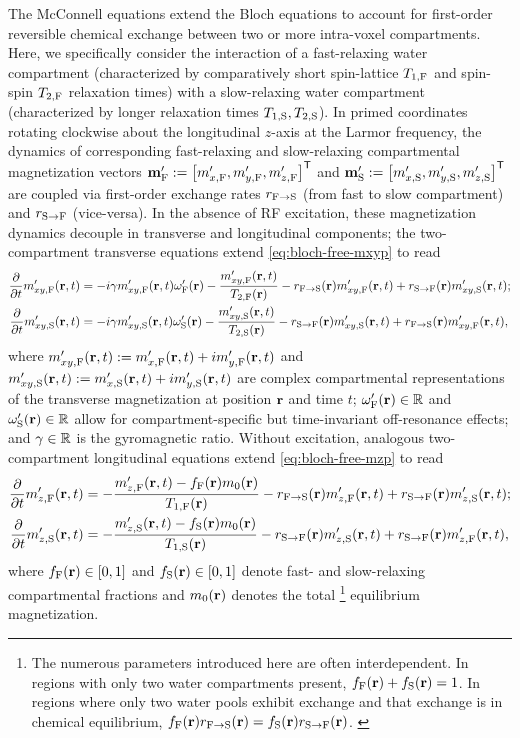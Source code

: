 The McConnell equations \cite{mcconnell:58:rrb}
extend the Bloch equations \cite{bloch:1946:ni-paper}
to account for first-order reversible chemical exchange
between two or more intra-voxel compartments. 
Here,
we specifically consider the interaction
of a fast-relaxing water compartment
(characterized by comparatively short spin-lattice $T_{1,\mathrm{F}}$ 
and spin-spin $T_{2,\mathrm{F}}$ relaxation times) 
with a slow-relaxing water compartment
(characterized by longer relaxation times $T_{1,\mathrm{S}},T_{2,\mathrm{S}}$).
In primed coordinates rotating clockwise 
about the longitudinal $z$-axis
at the Larmor frequency,
the dynamics 
of corresponding fast-relaxing and slow-relaxing
compartmental magnetization vectors
$\bmmpf := \brac{\mxpf, \mypf, \mzpf}\tpose$
and
$\bmmps := \brac{\mxps, \myps, \mzps}\tpose$
are coupled via first-order exchange rates 
$r_{\mathrm{F}\to\mathrm{S}}$ (from fast to slow compartment) 
and $r_{\mathrm{S}\to\mathrm{F}}$ (vice-versa).
In the absence of RF excitation,
these magnetization dynamics
decouple in transverse and longitudinal components;
the two-compartment transverse equations 
extend \eqref{eq:bloch-free-mxyp} to read
\begin{align}
	\dela{t} \mxypf\prt &= 
		-i\gam \mxypf\prt \ompf\pr - \frac{\mxypf\prt}{\tf{2}\pr} 
		- \rfs\pr \mxypf\prt + \rsf\pr \mxyps\prt;
		\label{eq:mwf,mxy-f} \\
	\dela{t} \mxyps\prt &= 
		-i\gam \mxyps\prt \omps\pr - \frac{\mxyps\prt}{\ts{2}\pr} 
		- \rsf\pr \mxyps\prt + \rfs\pr \mxypf\prt,
		\label{eq:mwf,mxy-s}
\end{align}
where 
$\mxypf\prt := \mxpf\prt + i\mypf\prt$ 
and $\mxyps\prt := \mxps\prt + i\myps\prt$
are complex compartmental representations
of the transverse magnetization
at position $\mathbf{r}$ 
and time $t$; 
$\ompf\pr \in \real$ and $\omps\pr \in \real$ 
allow for compartment-specific 
but time-invariant off-resonance effects;
and $\gamma \in \mathbb{R}$ is the gyromagnetic ratio.
Without excitation,
analogous two-compartment longitudinal equations 
extend \eqref{eq:bloch-free-mzp} to read
\begin{align}
	\dela{t} \mzpf\prt &=
		-\frac{\mzpf\prt - \ff\pr\mzero\pr}{\tf{1}\pr} 
		- \rfs\pr \mzpf\prt + \rsf\pr \mzps\prt;
		\label{eq:mwf,mz-f} \\
	\dela{t} \mzps\prt &= 
		-\frac{\mzps\prt - \fs\pr\mzero\pr}{\ts{1}\pr}
		- \rsf\pr \mzps\prt + \rsf\pr \mzpf\prt,
		\label{eq:mwf,mz-s}
\end{align}
where $\ff\pr \in \brac{0,1}$ and $\fs\pr \in \brac{0,1}$ 
denote fast- and slow-relaxing
compartmental fractions
and $\mzero\pr$ denotes the total 
\footnote{The numerous parameters introduced here
	are often interdependent. 
	In regions with only two water compartments present,
	$\ff\pr + \fs\pr = 1$.
	In regions where only two water pools exhibit exchange 
	and that exchange is in chemical equilibrium,
	$\ff\pr \rfs\pr = \fs\pr \rsf\pr$.
	\label{foot:constraint}
}
equilibrium magnetization.
 
